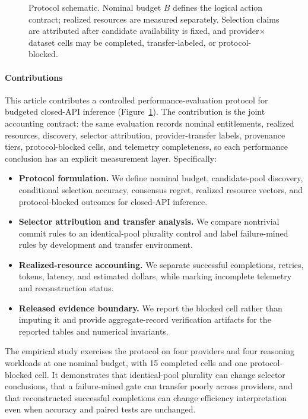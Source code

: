 \begin{figure}[t]
\centering
\resizebox{\linewidth}{!}{}
\caption{Protocol schematic. Nominal budget $B$ defines the logical action contract; realized
resources are measured separately. Selection claims are attributed after candidate availability is
fixed, and provider$\times$dataset cells may be completed, transfer-labeled, or protocol-blocked.}
\label{fig:protocol}
\end{figure}

\paragraph{Contributions}
This article contributes a controlled performance-evaluation protocol for budgeted closed-API
inference (Figure~\ref{fig:protocol}). The contribution is the joint accounting contract: the same
evaluation records nominal entitlements, realized resources, discovery, selector attribution,
provider-transfer labels, provenance tiers, protocol-blocked cells, and telemetry completeness, so
each performance conclusion has an explicit measurement layer. Specifically:
\begin{itemize}
\item \textbf{Protocol formulation.} We define nominal budget, candidate-pool discovery,
conditional selection accuracy, consensus regret, realized resource vectors, and protocol-blocked
outcomes for closed-API inference.
\item \textbf{Selector attribution and transfer analysis.} We compare nontrivial commit rules to an
identical-pool plurality control and label failure-mined rules by development and transfer
environment.
\item \textbf{Realized-resource accounting.} We separate successful completions, retries, tokens,
latency, and estimated dollars, while marking incomplete telemetry and reconstruction status.
\item \textbf{Released evidence boundary.} We report the blocked cell rather than imputing it and
provide aggregate-record verification artifacts for the reported tables and numerical invariants.
\end{itemize}

The empirical study exercises the protocol on four providers and four reasoning workloads at one
nominal budget, with 15 completed cells and one protocol-blocked cell. It demonstrates that
identical-pool plurality can change selector conclusions, that a failure-mined gate can transfer
poorly across providers, and that reconstructed successful completions can change efficiency
interpretation even when accuracy and paired tests are unchanged.

